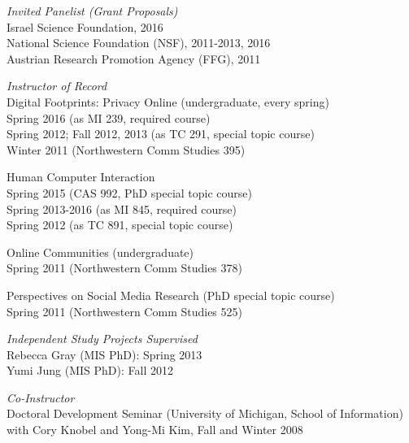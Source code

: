\documentclass[9pt]{extarticle}
\makeatletter
\renewcommand{\section}{%
  \@startsection{section}{1}{0em}{\baselineskip}{3pt}{\large\bfseries\textsc}}
\makeatother
\begin{document}
\emph{Invited Panelist (Grant Proposals)} \\
Israel Science Foundation, 2016 \\
National Science Foundation (NSF), 2011-2013, 2016 \\
Austrian Research Promotion Agency (FFG), 2011


\section{Teaching}

\emph{Instructor of Record} \\
Digital Footprints: Privacy Online (undergraduate, every spring) \\ 
\hspace{0.5cm} Spring 2016 (as MI 239, required course) \\
\hspace{0.5cm} Spring 2012; Fall 2012, 2013 (as TC 291, special topic course) \\ 
\hspace{0.5cm} Winter 2011 (Northwestern Comm Studies 395)

Human Computer Interaction \\
\hspace{0.5cm} Spring 2015 (CAS 992, PhD special topic course) \\
\hspace{0.5cm} Spring 2013-2016 (as MI 845, required course) \\
\hspace{0.5cm} Spring 2012 (as TC 891, special topic course)

Online Communities (undergraduate) \\
\hspace{0.5cm} Spring 2011 (Northwestern Comm Studies 378)

Perspectives on Social Media Research (PhD special topic course)\\
\hspace{0.5cm} Spring 2011 (Northwestern Comm Studies 525) 

\emph{Independent Study Projects Supervised} \\
Rebecca Gray (MIS PhD): Spring 2013 \\
Yumi Jung (MIS PhD): Fall 2012

\emph{Co-Instructor} \\
Doctoral Development Seminar (University of Michigan, School of Information) \\
\hspace{0.5cm} with Cory Knobel and Yong-Mi Kim, Fall and Winter 2008
\end{document}
